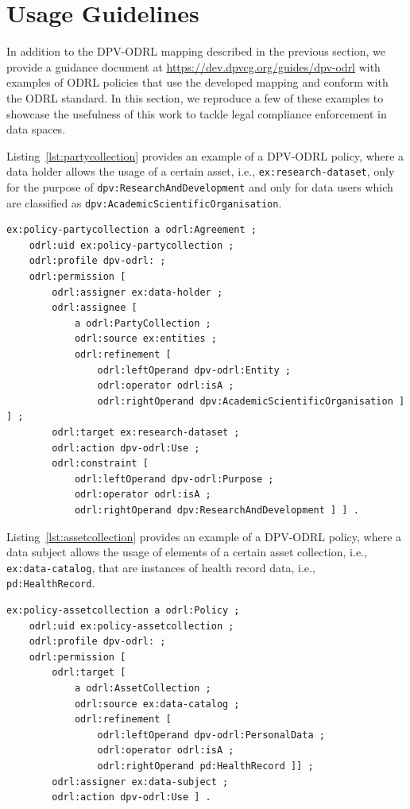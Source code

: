\section{Usage Guidelines}
\label{sec:guidelines}

In addition to the DPV-ODRL mapping
described in the previous section,
we provide a guidance document 
at \url{https://dev.dpvcg.org/guides/dpv-odrl}
with examples of ODRL policies that use the developed mapping
and conform with the ODRL standard.
In this section,
we reproduce a few of these examples to 
showcase the usefulness of this work
to tackle legal compliance enforcement
in data spaces.

Listing~\ref{lst:partycollection}
provides an example of a DPV-ODRL policy,
where a data holder allows the usage of a certain asset,
i.e., \texttt{ex:research-dataset},
only for the purpose of
\texttt{dpv:ResearchAndDevelopment}
and only for data users which are classified as 
\texttt{dpv:AcademicScientificOrganisation}.

\begin{scriptsize}
\begin{lstlisting}[language=turtle, caption=Purpose-restricted agreement with a party collection refinement., label=lst:partycollection]
ex:policy-partycollection a odrl:Agreement ;
    odrl:uid ex:policy-partycollection ;
    odrl:profile dpv-odrl: ;
    odrl:permission [
        odrl:assigner ex:data-holder ;
        odrl:assignee [ 
            a odrl:PartyCollection ;
            odrl:source ex:entities ;
            odrl:refinement [
                odrl:leftOperand dpv-odrl:Entity ;
                odrl:operator odrl:isA ;
                odrl:rightOperand dpv:AcademicScientificOrganisation ] ] ;
        odrl:target ex:research-dataset ;
        odrl:action dpv-odrl:Use ;
        odrl:constraint [
            odrl:leftOperand dpv-odrl:Purpose ;
            odrl:operator odrl:isA ;
            odrl:rightOperand dpv:ResearchAndDevelopment ] ] .
\end{lstlisting}
\end{scriptsize}

Listing~\ref{lst:assetcollection}
provides an example of a DPV-ODRL policy,
where a data subject allows the usage of elements
of a certain asset collection,
i.e., \texttt{ex:data-catalog},
that are instances of health record data,
i.e., \texttt{pd:HealthRecord}.

\begin{scriptsize}
\begin{lstlisting}[language=turtle, caption=Policy with a DPV-ODRL-based asset collection refinement on personal data type., label=lst:assetcollection]
ex:policy-assetcollection a odrl:Policy ;
    odrl:uid ex:policy-assetcollection ;
    odrl:profile dpv-odrl: ;
    odrl:permission [
        odrl:target [ 
            a odrl:AssetCollection ;
            odrl:source ex:data-catalog ;
            odrl:refinement [
                odrl:leftOperand dpv-odrl:PersonalData ;
                odrl:operator odrl:isA ;
                odrl:rightOperand pd:HealthRecord ]] ;
        odrl:assigner ex:data-subject ;
        odrl:action dpv-odrl:Use ] .
\end{lstlisting}
\end{scriptsize}

